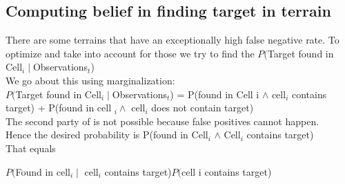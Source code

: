 \documentclass[12pt]{article} %
\begin{document}
\subsection{Computing belief in finding target in terrain}
There are some terrains that have an exceptionally high false negative rate. To optimize and take into account for those we try to find the $P($Target found in Cell$_i\mid$Observations$_t$)\\
We go about this using marginalization:\\
$P($Target found in Cell$_i\mid$Observations$_t$) = P(found in Cell i $\wedge$ cell$_i$ contains target) + P(found in cell $_i \wedge$ cell$_i$ does not contain target)\\
The second party of is not possible because false positives cannot happen. \\
Hence the desired probability is P(found in Cell$_i$ $\wedge$ Cell$_i$ contains target)\\
That equals
\begin{center}
  $P($Found in cell$_i \mid$ cell$_i$ contains target)$P($cell i contains target)
\end{center}
\end{document}
